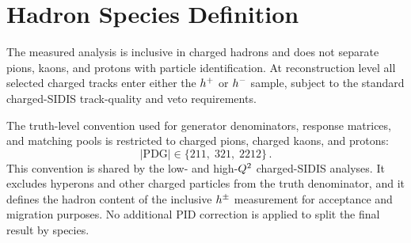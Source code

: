 \section{Hadron Species Definition}
\label{sec:species_definition}

The measured analysis is inclusive in charged hadrons and does not separate
pions, kaons, and protons with particle identification.  At reconstruction level
all selected charged tracks enter either the $h^{+}$ or $h^{-}$ sample,
subject to the standard charged-SIDIS track-quality and veto requirements.

The truth-level convention used for generator denominators, response matrices,
and matching pools is restricted to charged pions, charged kaons, and protons:
\begin{equation}
  |\mathrm{PDG}| \in \{211,\;321,\;2212\}\, .
\end{equation}
This convention is shared by the low- and high-$Q^{2}$ charged-SIDIS analyses.
It excludes hyperons and other charged particles from the truth denominator,
and it defines the hadron content of the inclusive $h^{\pm}$ measurement for
acceptance and migration purposes.  No additional PID correction is applied to
split the final result by species.
